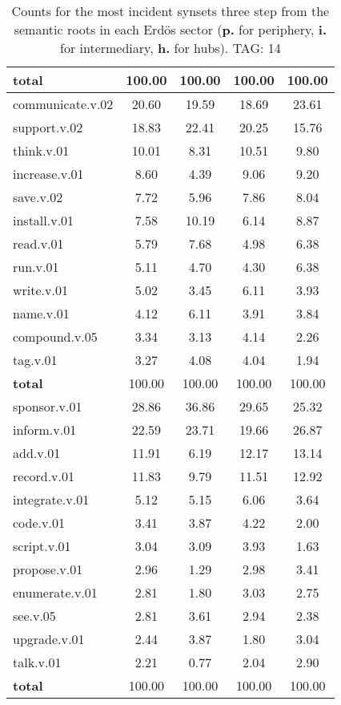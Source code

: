 \begin{table}[h!]
\begin{center}
\begin{tabular}{| l || c | c | c | c |}
{{\bf total}} & 100.00  & 100.00  & 100.00  & 100.00 \\\hline\hline\hline
communicate.v.02 & 20.60  & 19.59  & 18.69  & 23.61 \\\hline
support.v.02 & 18.83  & 22.41  & 20.25  & 15.76 \\\hline
think.v.01 & 10.01  & 8.31  & 10.51  & 9.80 \\\hline
increase.v.01 & 8.60  & 4.39  & 9.06  & 9.20 \\\hline
save.v.02 & 7.72  & 5.96  & 7.86  & 8.04 \\\hline
install.v.01 & 7.58  & 10.19  & 6.14  & 8.87 \\\hline
read.v.01 & 5.79  & 7.68  & 4.98  & 6.38 \\\hline
run.v.01 & 5.11  & 4.70  & 4.30  & 6.38 \\\hline
write.v.01 & 5.02  & 3.45  & 6.11  & 3.93 \\\hline
name.v.01 & 4.12  & 6.11  & 3.91  & 3.84 \\\hline
compound.v.05 & 3.34  & 3.13  & 4.14  & 2.26 \\\hline
tag.v.01 & 3.27  & 4.08  & 4.04  & 1.94 \\\hline\hline
{{\bf total}} & 100.00  & 100.00  & 100.00  & 100.00 \\\hline\hline\hline
sponsor.v.01 & 28.86  & 36.86  & 29.65  & 25.32 \\\hline
inform.v.01 & 22.59  & 23.71  & 19.66  & 26.87 \\\hline
add.v.01 & 11.91  & 6.19  & 12.17  & 13.14 \\\hline
record.v.01 & 11.83  & 9.79  & 11.51  & 12.92 \\\hline
integrate.v.01 & 5.12  & 5.15  & 6.06  & 3.64 \\\hline
code.v.01 & 3.41  & 3.87  & 4.22  & 2.00 \\\hline
script.v.01 & 3.04  & 3.09  & 3.93  & 1.63 \\\hline
propose.v.01 & 2.96  & 1.29  & 2.98  & 3.41 \\\hline
enumerate.v.01 & 2.81  & 1.80  & 3.03  & 2.75 \\\hline
see.v.05 & 2.81  & 3.61  & 2.94  & 2.38 \\\hline
upgrade.v.01 & 2.44  & 3.87  & 1.80  & 3.04 \\\hline
talk.v.01 & 2.21  & 0.77  & 2.04  & 2.90 \\\hline\hline
{{\bf total}} & 100.00  & 100.00  & 100.00  & 100.00 \\\hline
\end{tabular}
\caption{Counts for the most incident synsets three step from the semantic roots in each Erd\"os sector ({\bf p.} for periphery, {\bf i.} for intermediary, {\bf h.} for hubs). TAG: 14}
\end{center}
\end{table}